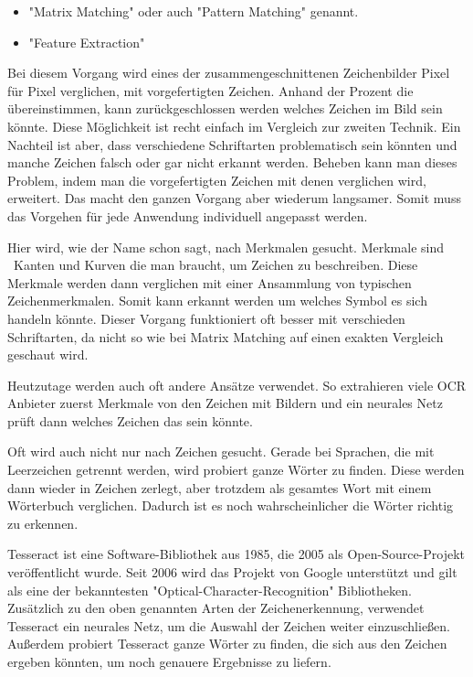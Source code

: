 \begin{itemize}
    \item "Matrix Matching" oder auch "Pattern Matching" genannt.
    \item "Feature Extraction"
\end{itemize}


Bei diesem Vorgang wird eines der zusammengeschnittenen Zeichenbilder Pixel für Pixel verglichen, mit vorgefertigten Zeichen. Anhand der Prozent die übereinstimmen, kann zurückgeschlossen werden welches Zeichen im Bild sein könnte. Diese Möglichkeit ist recht einfach im Vergleich zur zweiten Technik. Ein Nachteil ist aber, dass verschiedene Schriftarten problematisch sein könnten und manche Zeichen falsch oder gar nicht erkannt werden. Beheben kann man dieses Problem, indem man die vorgefertigten Zeichen mit denen verglichen wird, erweitert. Das macht den ganzen Vorgang aber wiederum langsamer. Somit muss das Vorgehen für jede Anwendung individuell angepasst werden.\cite{OCRRecognition}


Hier wird, wie der Name schon sagt, nach Merkmalen gesucht. Merkmale sind \zb\ Kanten und Kurven die man braucht, um Zeichen zu beschreiben. Diese Merkmale werden dann verglichen mit einer Ansammlung von typischen Zeichenmerkmalen. Somit kann erkannt werden um welches Symbol es sich handeln könnte. Dieser Vorgang funktioniert oft besser mit verschieden Schriftarten, da nicht so wie bei Matrix Matching auf einen exakten Vergleich geschaut wird.\cite{OCRRecognition}


Heutzutage werden auch oft andere Ansätze verwendet. So extrahieren viele OCR Anbieter zuerst Merkmale von den Zeichen mit Bildern und ein neurales Netz prüft dann welches Zeichen das sein könnte.

Oft wird auch nicht nur nach Zeichen gesucht. Gerade bei Sprachen, die mit Leerzeichen getrennt werden, wird probiert ganze Wörter zu finden. Diese werden dann wieder in Zeichen zerlegt, aber trotzdem als gesamtes Wort mit einem Wörterbuch verglichen. Dadurch ist es noch wahrscheinlicher die Wörter richtig zu erkennen. 

\label{sec:tesseract}

Tesseract ist eine Software-Bibliothek aus 1985, die 2005 als Open-Source-Projekt veröffentlicht wurde. Seit 2006 wird das Projekt von Google unterstützt und gilt als eine der bekanntesten "Optical-Character-Recognition" Bibliotheken. Zusätzlich zu den oben genannten Arten der Zeichenerkennung, verwendet Tesseract ein neurales Netz, um die Auswahl der Zeichen weiter einzuschließen. Außerdem probiert Tesseract ganze Wörter zu finden, die sich aus den Zeichen ergeben könnten, um noch genauere Ergebnisse zu liefern.\cite{Tesseract}

